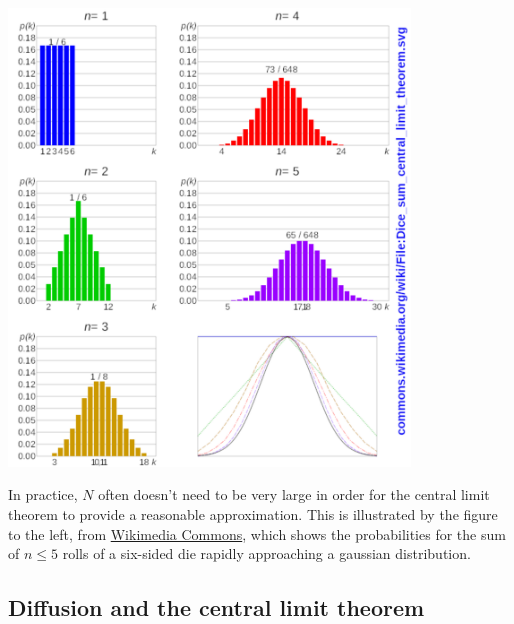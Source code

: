 \begin{minipage}{0.55\textwidth}
  \includegraphics[width=0.8\textwidth]{figs/unit01_CLT.pdf}
\end{minipage}%
\begin{minipage}{0.35\textwidth}
  In practice, $N$ often doesn't need to be very large in order for the central limit theorem to provide a reasonable approximation.
  This is illustrated by the figure to the left, from \href{https://commons.wikimedia.org/wiki/File:Dice_sum_central_limit_theorem.svg}{{Wikimedia Commons}}, which shows the probabilities for the sum of $n \leq 5$ rolls of a six-sided die rapidly approaching a gaussian distribution.
\end{minipage}



\subsection{\label{sec:diffusion}Diffusion and the central limit theorem}
